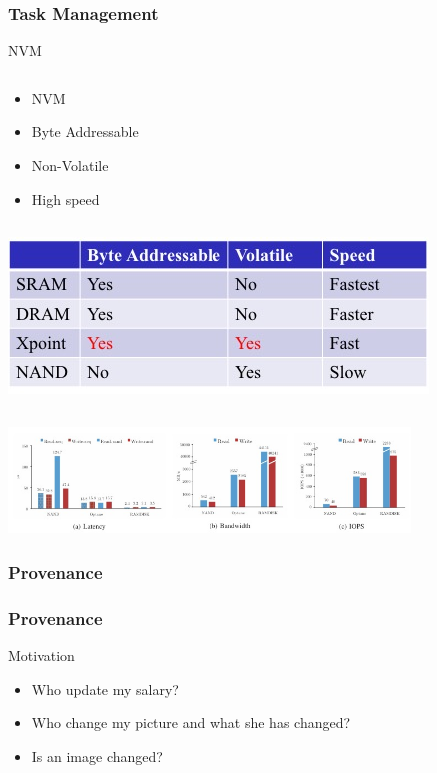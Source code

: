 \begin{frame}
\frametitle{Task Management}
\begin{block}{NVM}
\begin{column}{.5\textwidth}

\begin{itemize}
	\item NVM
	\item Byte Addressable 
	\item Non-Volatile
	\item High speed
\end{itemize} 

\end{column}
\begin{column}{.5\textwidth}
\includegraphics[width=\textwidth]{fig23/nvm.jpg}
\end{column}

\centering
\includegraphics[width=0.8\textwidth]{fig23/nvm2.jpg}
\end{block}
\end{frame}

\subsubsection{Provenance}

\begin{frame}
\frametitle{Provenance}
\begin{block}{Motivation}
\begin{itemize}
	\item Who update my salary?
	\item Who change my picture and what she has changed?
	\item Is an image changed?
\end{itemize} 
\end{block}
\end{frame}





